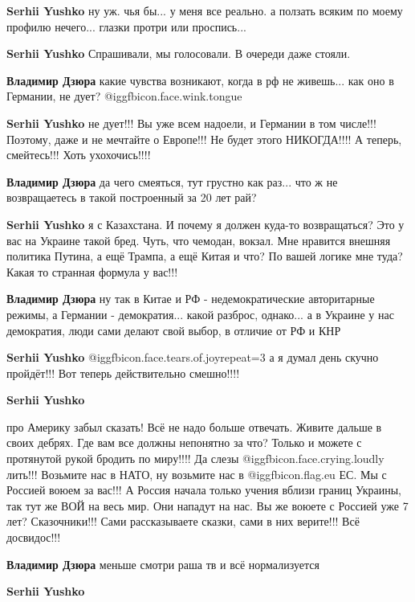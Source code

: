 \begin{itemize}
\begin{itemize}
\textbf{Serhii Yushko} ну уж. чья бы... у меня все реально. а ползать всяким по моему профилю нечего... глазки протри или проспись...

\textbf{Serhii Yushko} Спрашивали, мы голосовали. В очереди даже стояли.

\textbf{Владимир Дзюра} какие чувства возникают, когда в рф не живешь... как оно в Германии, не дует? @igg{fbicon.face.wink.tongue} 

\textbf{Serhii Yushko} не дует!!! Вы уже всем надоели, и Германии в том числе!!! Поэтому, даже и не мечтайте о Европе!!! Не будет этого НИКОГДА!!!! А теперь, смейтесь!!! Хоть ухохочись!!!!

\textbf{Владимир Дзюра} да чего смеяться, тут грустно как раз... что ж не возвращаетесь в такой построенный за 20 лет рай?

\textbf{Serhii Yushko} я с Казахстана. И почему я должен куда-то возвращаться? Это у вас на Украине такой бред. Чуть, что чемодан, вокзал. Мне нравится внешняя политика Путина, а ещё Трампа, а ещё Китая и что? По вашей логике мне туда? Какая то странная формула у вас!!!

\textbf{Владимир Дзюра} ну так в Китае и РФ - недемократические авторитарные режимы, а Германии - демократия... какой разброс, однако... а в Украине у нас демократия, люди сами делают свой выбор, в отличие от РФ и КНР

\textbf{Serhii Yushko}  @igg{fbicon.face.tears.of.joy}{repeat=3} а я думал день скучно пройдёт!!! Вот теперь действительно смешно!!!!

\textbf{Serhii Yushko} 

про Америку забыл сказать! Всё не надо больше отвечать. Живите дальше в своих
дебрях. Где вам все должны непонятно за что? Только и можете с протянутой рукой
бродить по миру!!!! Да слезы  @igg{fbicon.face.crying.loudly}  лить!!! Возьмите нас в НАТО, ну возьмите нас в
@igg{fbicon.flag.eu}  ЕС. Мы с Россией воюем за вас!!! А Россия начала только учения вблизи
границ Украины, так тут же ВОЙ на весь мир. Они нападут на нас. Вы же воюете с
Россией уже 7 лет? Сказочники!!! Сами рассказываете сказки, сами в них
верите!!! Всё досвидос!!!

\textbf{Владимир Дзюра} меньше смотри раша тв и всё нормализуется

\textbf{Serhii Yushko} 


\end{itemize}
\end{itemize}
